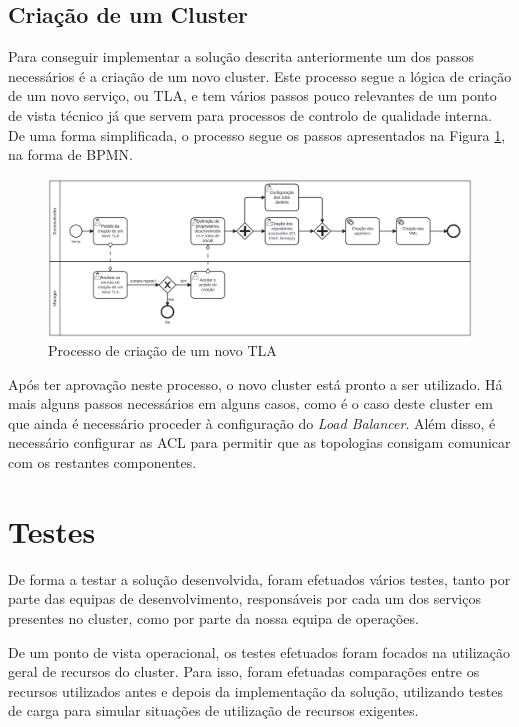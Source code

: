 \subsection{Criação de um Cluster}

Para conseguir implementar a solução descrita anteriormente um dos passos necessários é a criação
de um novo \gls{cluster}. Este processo segue a lógica de criação de um novo serviço, ou \ac{TLA}, 
e tem vários passos pouco relevantes de um ponto de vista técnico já que servem para processos de 
controlo de qualidade interna. De uma forma simplificada, o processo segue os passos apresentados 
na Figura \ref{create-tla}, na forma de \ac{BPMN}.

\begin{figure}[H]
  \centerline{\includegraphics[scale=0.13]{media/content/impl/create-tla.png}}
  \caption{Processo de criação de um novo TLA}
  \label{create-tla}
\end{figure}

Após ter aprovação neste processo, o novo \gls{cluster} está pronto a ser utilizado. Há mais 
alguns passos necessários em alguns casos, como é o caso deste \gls{cluster} em que ainda é
necessário proceder à configuração do \textit{Load Balancer}. Além disso, é necessário 
configurar as \ac{ACL} para permitir que as topologias consigam comunicar com os restantes
componentes.

\section{Testes}

De forma a testar a solução desenvolvida, foram efetuados vários testes, tanto por parte das
equipas de desenvolvimento, responsáveis por cada um dos serviços presentes no \gls{cluster},
como por parte da nossa equipa de operações. 

De um ponto de vista operacional, os testes efetuados foram focados na utilização geral de
recursos do \gls{cluster}. Para isso, foram efetuadas comparações entre os recursos utilizados
antes e depois da implementação da solução, utilizando testes de carga para simular situações
de utilização de recursos exigentes.

